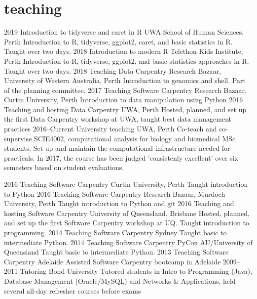 \documentclass[]{friggeri-cv} %
\begin{document}
\section{teaching}

\begin{entrylist}
\entry
{2019}
{Introduction to tidyverse and caret in R}
{UWA School of Human Sciences, Perth}
{Introduction to R, tidyverse, ggplot2, caret, and basic statistics in R. Taught over two days.}
\entry
{2018}
{Introduction to modern R}
{Telethon Kids Institute, Perth}
{Introduction to R, tidyverse, ggplot2, and basic statistics approaches in R. Taught over two days.}
\entry
{2018}
{Teaching Data Carpentry}
{Research Bazaar, University of Western Australia, Perth}
{Introduction to genomics and shell. Part of the planning committee.}
\entry
{2017}
{Teaching Software Carpentry}
{Research Bazaar, Curtin University, Perth}
{Introduction to data manipulation using Python}
\entry
{2016}
{Teaching and hosting Data Carpentry}
{UWA, Perth}
{Hosted, planned, and set up the first Data Carpentry workshop at UWA, taught best data management practices}
\entry
{2016--Current}
{University teaching}
{UWA, Perth}
{Co-teach and co-supervise SCIE4002, computational analysis for biology and biomedical MSc students. Set up and maintain the computational infrastructure needed for practicals. In 2017, the course has been judged 'consistenly excellent' over six semesters based on student evaluations.}
\end{entrylist}
\begin{entrylist}
\entry
{2016}
{Teaching Software Carpentry}
{Curtin University, Perth}
{Taught introduction to Python}
\entry
{2016}
{Teaching Software Carpentry}
{Research Bazaar, Murdoch University, Perth}
{Taught introduction to Python and git}
\entry
{2016}
{Teaching and hosting Software Carpentry}
{University of Queensland, Brisbane}
{Hosted, planned, and set up the first Software Carpentry workshop at UQ. Taught introduction to programming.}
\entry
{2014}
{Teaching Software Carpentry}
{Sydney}
{Taught basic to intermediate Python.}
\entry
{2014}
{Teaching Software Carpentry}
{PyCon AU/University of Queensland}
{Taught basic to intermediate Python.}
\entry
{2013}
{Teaching Software Carpentry}
{Adelaide}
{Assisted Software Carpentry bootcamp in Adelaide}
\entry
{2009--2011}
{Tutoring}
{Bond University}
{Tutored students in Intro to Programming (Java), Database Management (Oracle/MySQL) and Networks \& Applications, held several all-day refresher courses before exams}
\end{entrylist}
\end{document}
